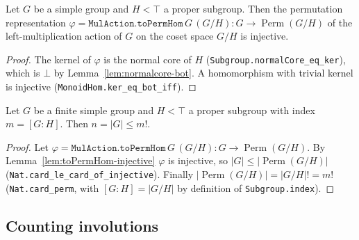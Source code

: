 \begin{lemma}
    \label{lem:toPermHom-injective}
    \leanok
    Let $G$ be a simple group and $H < \top$ a proper subgroup. Then the
    permutation representation
    $\varphi = \texttt{MulAction.toPermHom}\,G\,(G/H) : G \to
    \operatorname{Perm}(G/H)$ of the left-multiplication action of $G$ on the
    coset space $G/H$ is injective.
\end{lemma}
\begin{proof}
    The kernel of $\varphi$ is the normal core of $H$
    (\texttt{Subgroup.normalCore\_eq\_ker}), which is $\bot$ by
    Lemma~\ref{lem:normalcore-bot}. A homomorphism with trivial kernel is
    injective (\texttt{MonoidHom.ker\_eq\_bot\_iff}).
\end{proof}

\begin{lemma}
    \label{lem:card-le-index-factorial}
    \leanok
    Let $G$ be a finite simple group and $H < \top$ a proper subgroup with index
    $m = [G : H]$. Then $n = |G| \le m!$.
\end{lemma}
\begin{proof}
    Let $\varphi = \texttt{MulAction.toPermHom}\,G\,(G/H) : G \to
    \operatorname{Perm}(G/H)$. By Lemma~\ref{lem:toPermHom-injective} $\varphi$ is
    injective, so $|G| \le |\operatorname{Perm}(G/H)|$
    (\texttt{Nat.card\_le\_card\_of\_injective}). Finally
    $|\operatorname{Perm}(G/H)| = |G/H|! = m!$
    (\texttt{Nat.card\_perm}, with $[G:H] = |G/H|$ by definition of
    \texttt{Subgroup.index}).
\end{proof}

\subsection{Counting involutions}

